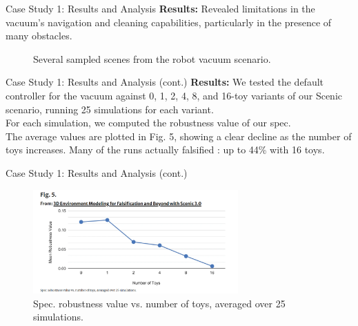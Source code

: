 \documentclass[10pt]{beamer}
\begin{document}
\begin{frame}{Case Study 1: Results and Analysis}
\textbf{Results:} Revealed limitations in the vacuum's navigation and cleaning capabilities, particularly in the presence of many obstacles.
    \begin{figure}
        \centering
        \caption{Several sampled scenes from the robot vacuum scenario.}
        \label{fig:robot-vacuum}
    \end{figure}
\end{frame}

\begin{frame}{Case Study 1: Results and Analysis (cont.)} 
\textbf{Results:} We tested the default controller for the vacuum against 0, 1, 2, 4, 8, and 16-toy variants of our Scenic scenario, running 25 simulations for each variant.\\For each simulation, we computed the robustness value of our spec.\\The average values are plotted in Fig. 5, showing a clear decline as the number of toys increases. Many of the runs actually falsified : up to 44\% with 16 toys.
\end{frame}

\begin{frame}{Case Study 1: Results and Analysis (cont.)}
    \begin{figure}
        \centering
        \includegraphics[width=0.7\textwidth]{FIG5.png}
        \caption{Spec. robustness value vs. number of toys, averaged over 25 simulations.}
        \label{fig:case-study-1}
    \end{figure}
\end{frame}
\end{document}
